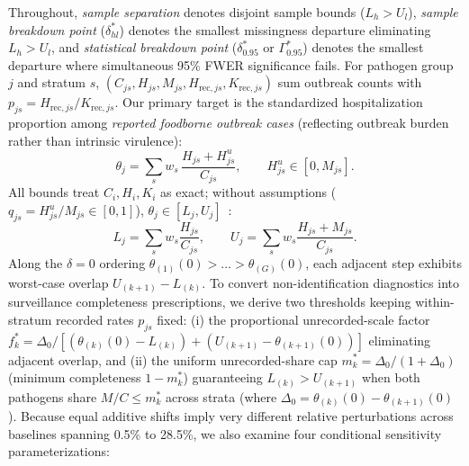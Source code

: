 Throughout, \textit{sample separation} denotes disjoint sample bounds ($L_h > U_l$), \textit{sample breakdown point} ($\delta^{*}_{hl}$) denotes the smallest missingness departure eliminating $L_h > U_l$, and \textit{statistical breakdown point} ($\delta^{*}_{0.95}$ or $\Gamma^{*}_{0.95}$) denotes the smallest departure where simultaneous 95\% FWER significance fails. For pathogen group $j$ and stratum $s$, $(C_{js}, H_{js}, M_{js}, H_{\text{rec},js}, K_{\text{rec},js})$ sum outbreak counts with $p_{js} = H_{\text{rec},js}/K_{\text{rec},js}$. Our primary target is the standardized hospitalization proportion among \textit{reported foodborne outbreak cases} (reflecting outbreak burden rather than intrinsic virulence):
\begin{equation}
  \theta_j = \sum_s w_s \, \frac{H_{js} + H^{u}_{js}}{C_{js}}, \qquad H^{u}_{js} \in [0, M_{js}].
  \label{eq:theta}
\end{equation}
All bounds treat $C_i, H_i, K_i$ as exact; without assumptions ($q_{js} = H^{u}_{js}/M_{js} \in [0, 1]$), $\theta_j \in [L_j, U_j]$~\cite{manski1989anatomy}:
\begin{equation}
  L_j = \sum_s w_s \frac{H_{js}}{C_{js}}, \qquad
  U_j = \sum_s w_s \frac{H_{js} + M_{js}}{C_{js}}.
  \label{eq:bounds}
\end{equation}
Along the $\delta=0$ ordering $\theta_{(1)}(0) > \dots > \theta_{(G)}(0)$, each adjacent step exhibits worst-case overlap $U_{(k+1)} - L_{(k)}$. To convert non-identification diagnostics into surveillance completeness prescriptions, we derive two thresholds keeping within-stratum recorded rates $p_{js}$ fixed: (i) the proportional unrecorded-scale factor $f^{*}_{k} = \Delta_0 / [(\theta_{(k)}(0) - L_{(k)}) + (U_{(k+1)} - \theta_{(k+1)}(0))]$ eliminating adjacent overlap, and (ii) the uniform unrecorded-share cap $m^{*}_k = \Delta_0 / (1 + \Delta_0)$ (minimum completeness $1 - m^{*}_k$) guaranteeing $L_{(k)} > U_{(k+1)}$ when both pathogens share $M/C \le m^{*}_k$ across strata (where $\Delta_0 = \theta_{(k)}(0) - \theta_{(k+1)}(0)$). Because equal additive shifts imply very different relative perturbations across baselines spanning 0.5\% to 28.5\%, we also examine four conditional sensitivity parameterizations:
